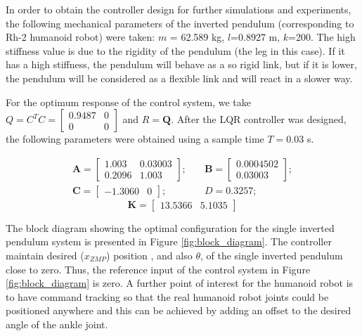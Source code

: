 In order to obtain the controller design for further simulations and experiments, the following mechanical parameters of the inverted pendulum (corresponding to Rh-2 humanoid robot) were taken: $m$ = 62.589 kg, $l$=0.8927 m, $k$=200. The high stiffness value is due to the rigidity of the pendulum (the leg in this case). If it has a high stiffness, the pendulum will behave as a so rigid link, but if it is lower, the pendulum will be considered as a flexible link and will react in a slower way.

For the optimum response of the control system, we take $Q = C^{T}C = \begin{bmatrix}
0.9487 & 0\\
0 & 0
\end{bmatrix}$ and $R = \mathbf{Q}$. 
After the LQR controller was designed, the following parameters were obtained using a sample time $T = 0.03$ s.

\begin{align}
\mathbf{A} = 
	\begin{bmatrix}
		1.003 & 0.03003 \\
		0.2096 & 1.003
	\end{bmatrix}; & \quad
\mathbf{B} = 
	\begin{bmatrix}
		0.0004502\\
		0.03003
	\end{bmatrix}; \nonumber \\
\mathbf{C} = 
	\begin{bmatrix}
		-1.3060 & 0
	\end{bmatrix}; & \quad
D = 0.3257;
\end{align}
\begin{equation}
\mathbf{K} = 
	\begin{bmatrix}
		13.5366 & 5.1035
	\end{bmatrix}
\end{equation}

The block diagram showing the optimal configuration for the single inverted pendulum system is presented in Figure \ref{fig:block_diagram}. The controller maintain desired ($x_{ZMP}$) position , and also $\theta$, of the single inverted pendulum close to zero. Thus, the reference input of the control system in Figure \ref{fig:block_diagram} is zero. A further point of interest for the humanoid robot is to have command tracking so that the real humanoid robot joints could be positioned anywhere and this can be achieved by adding an offset to the desired angle of the ankle joint. 

